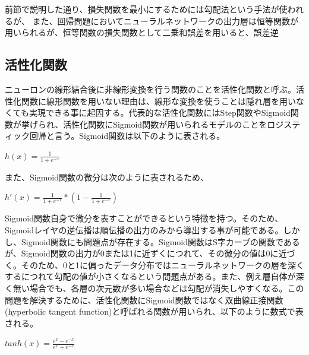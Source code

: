 \documentclass{article}
\begin{document}
前節で説明した通り、損失関数を最小にするためには勾配法という手法が使われるが、
また、回帰問題においてニューラルネットワークの出力層は恒等関数が用いられるが、恒等関数の損失関数として二乗和誤差を用いると、誤差逆



\subsection{活性化関数}

ニューロンの線形結合後に非線形変換を行う関数のことを活性化関数と呼ぶ。活性化関数に線形関数を用いない理由は、線形な変換を使うことは隠れ層を用いなくても実現できる事に起因する。代表的な活性化関数にはStep関数やSigmoid関数が挙げられ、活性化関数にSigmoid関数が用いられるモデルのことをロジスティック回帰と言う。Sigmoid関数は以下のように表される。



\begin{center}
\begin{math}
h(x) = \frac{1}{1+e^{-x}} 
\end{math}
\end{center}


また、Sigmoid関数の微分は次のように表されるため、

\begin{center}
\begin{math}
h'(x) = \frac{1}{1+e^{-x}} * (1 - \frac{1}{1+e^{-x}})
\end{math}
\end{center}

Sigmoid関数自身で微分を表すことができるという特徴を持つ。そのため、Sigmoidレイヤの逆伝播は順伝播の出力のみから導出する事が可能である。しかし、Sigmoid関数にも問題点が存在する。Sigmoid関数はS字カーブの関数であるが、Sigmoid関数の出力が0または1に近ずくにつれて、その微分の値は0に近づく。そのため、0と1に偏ったデータ分布ではニューラルネットワークの層を深くするにつれて勾配の値が小さくなるという問題点がある。また、例え層自体が深く無い場合でも、各層の次元数が多い場合などは勾配が消失しやすくなる。この問題を解決するために、活性化関数にSigmoid関数ではなく双曲線正接関数(hyperbolic tangent function)と呼ばれる関数が用いられ、以下のように数式で表される。


\begin{center}
\begin{math}
tanh(x) =  \frac{e^{x}-e^{-x}} {e^{x}+e^{-x}} 
\end{math}
\end{center}
\end{document}
